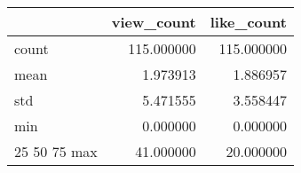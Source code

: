 \begin{tabular}{lrr}
\toprule
 & view_count & like_count \\
\midrule
count & 115.000000 & 115.000000 \\
mean & 1.973913 & 1.886957 \\
std & 5.471555 & 3.558447 \\
min & 0.000000 & 0.000000 \\
25%
50%
75%
max & 41.000000 & 20.000000 \\
\bottomrule
\end{tabular}
